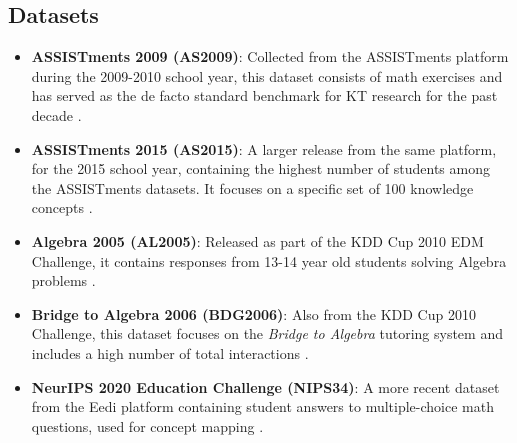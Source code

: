 \documentclass[applsci,article,submit,moreauthors,pdftex]{Definitions/mdpi}
\begin{document}
\subsection{Datasets}\label{sec_dataset}

 
\begin{itemize}
    \item \textbf{ASSISTments 2009 (AS2009)}: Collected from the ASSISTments platform during the 2009-2010 school year, this dataset consists of math exercises and has served as the de facto standard benchmark for KT research for the past decade \citep{feng2009addressing}.
    \item \textbf{ASSISTments 2015 (AS2015)}: A larger release from the same platform, for the 2015 school year, containing the highest number of students among the ASSISTments datasets. It focuses on a specific set of 100 knowledge concepts \citep{feng2009addressing}.
    \item \textbf{Algebra 2005 (AL2005)}: Released as part of the KDD Cup 2010 EDM Challenge, it contains responses from 13-14 year old students solving Algebra problems \citep{stamper2010algebra}.
    \item \textbf{Bridge to Algebra 2006 (BDG2006)}: Also from the KDD Cup 2010 Challenge, this dataset focuses on the \textit{Bridge to Algebra} tutoring system and includes a high number of total interactions \citep{stamper2010algebra}.
    \item \textbf{NeurIPS 2020 Education Challenge (NIPS34)}: A more recent dataset from the Eedi platform containing student answers to multiple-choice math questions,  used for concept mapping \citep{wang2020instructions}.
\end{itemize}
\end{document}
